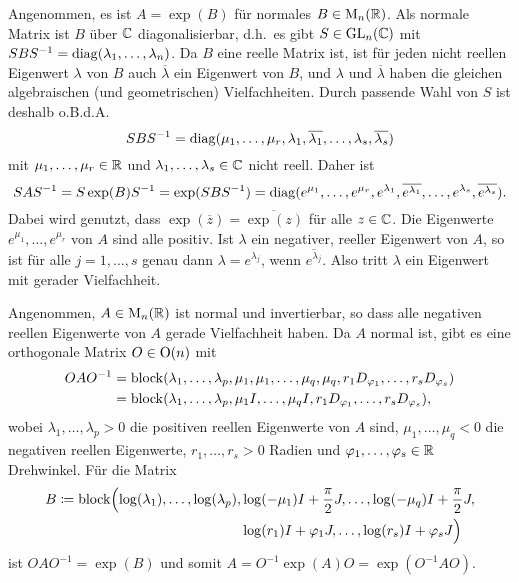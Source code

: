 \documentclass[a4paper, 10pt, numbers=noenddot]{scrartcl}
\begin{document}
Angenommen, es ist $A = \exp(B)$ für normales $B \in \operatorname{M}_n(\mathbb{R})$.
Als normale Matrix ist $B$ über $\mathbb{C}$ diagonalisierbar, d.h.\ es gibt $S \in \operatorname{GL}_n(\mathbb{C})$ mit $S B S^{-1} = \operatorname{\operatorname{diag}}(\lambda_1, \dotsc, \lambda_n)$.
Da $B$ eine reelle Matrix ist, ist für jeden nicht reellen Eigenwert $\lambda$ von $B$ auch $\overline{\lambda}$ ein Eigenwert von $B$, und $\lambda$ und $\overline{\lambda}$ haben die gleichen algebraischen (und geometrischen) Vielfachheiten.
Durch passende Wahl von $S$ ist deshalb o.B.d.A.
\[
    S B S^{-1}
  = \operatorname{\operatorname{diag}}(\mu_1, \dotsc, \mu_r, \lambda_1, \overline{\lambda_1}, \dotsc, \lambda_s, \overline{\lambda_s})
\]
mit $\mu_1, \dotsc, \mu_r \in \mathbb{R}$ und $\lambda_1, \dotsc, \lambda_s \in \mathbb{C}$ nicht reell.
Daher ist
\[
    S A S^{-1}
  = S \exp(B) S^{-1}
  = \exp(S B S^{-1})
  = \operatorname{\operatorname{diag}}(e^{\mu_1}, \dotsc, e^{\mu_r},
          e^{\lambda_1}, \overline{e^{\lambda_1}}, \dotsc, e^{\lambda_s}, \overline{e^{\lambda_s}}).
\]
Dabei wird genutzt, dass $\exp(\overline{z}) = \overline{\exp(z)}$ für alle $z \in \mathbb{C}$.
Die Eigenwerte $e^{\mu_1}, \dotsc, e^{\mu_r}$ von $A$ sind alle positiv.
Ist $\lambda$ ein negativer, reeller Eigenwert von $A$, so ist für alle $j = 1, \dotsc, s$ genau dann $\lambda = e^{\lambda_j}$, wenn $\overline{e^{\lambda_j}}$.
Also tritt $\lambda$ ein Eigenwert mit gerader Vielfachheit.

Angenommen, $A \in \operatorname{M}_n(\mathbb{R})$ ist normal und invertierbar, so dass alle negativen reellen Eigenwerte von $A$ gerade Vielfachheit haben.
Da $A$ normal ist, gibt es eine orthogonale Matrix $O \in \operatorname{O}(n)$ mit
\begin{align*}
      O A O^{-1}
  &=  \operatorname{\operatorname{block}}( \lambda_1, \dotsc, \lambda_p,
              \mu_1, \mu_1, \dotsc, \mu_q, \mu_q,
              r_1 D_{\varphi_1}, \dotsc, r_s D_{\varphi_s}  ) \\
  &=  \operatorname{\operatorname{block}}( \lambda_1, \dotsc, \lambda_p,
              \mu_1 I, \dotsc, \mu_q I,
              r_1 D_{\varphi_1}, \dotsc, r_s D_{\varphi_s}  ),
\end{align*}
wobei $\lambda_1, \dotsc, \lambda_p > 0$ die positiven reellen Eigenwerte von $A$ sind, $\mu_1, \dotsc, \mu_q < 0$ die negativen reellen Eigenwerte, $r_1, \dotsc, r_s > 0$ Radien und $\varphi_1, \dotsc, \varphi_s \in \mathbb{R}$ Drehwinkel.
Für die Matrix
\begin{align*}
  B
  \coloneqq \operatorname{\operatorname{block}}\Bigl(  \log(\lambda_1), \dotsc, \log(\lambda_p),
                         &\log(-\mu_1) I + \frac{\pi}{2} J, \dotsc, \log(-\mu_q) I + \frac{\pi}{2} J, \\
                         &\log(r_1) I + \varphi_1 J, \dotsc, \log(r_s) I + \varphi_s J                \Bigr)
\end{align*}
ist $O A O^{-1} = \exp(B)$ und somit $A = O^{-1} \exp(A) O = \exp(O^{-1} A O)$.
\end{document}
